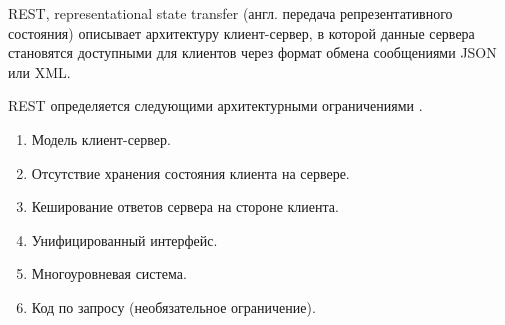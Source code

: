 
%
%

REST, representational state transfer (англ. передача репрезентативного состояния) \cite{Fielding} описывает архитектуру клиент-сервер, в которой данные сервера становятся доступными для клиентов через формат обмена сообщениями JSON или XML. %

REST определяется следующими архитектурными ограничениями \cite{Fielding}.

\begin{enumerate}[label*=\arabic*.]
	\item Модель клиент-сервер.
	\item Отсутствие хранения состояния клиента на сервере.
	\item Кеширование ответов сервера на стороне клиента.
	\item Унифицированный интерфейс.
	\item Многоуровневая система. %
	\item Код по запросу (необязательное ограничение).
\end{enumerate}




